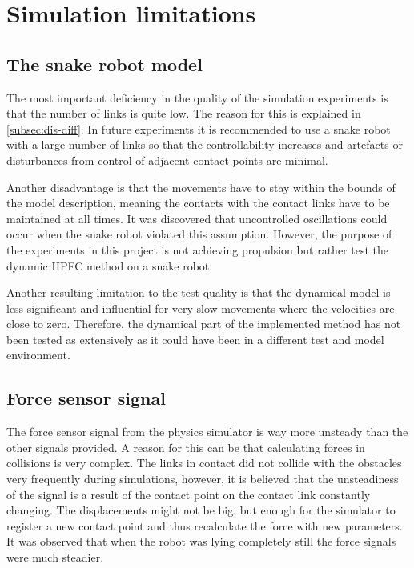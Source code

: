

\section{Simulation limitations}

\subsection{The snake robot model}

The most important deficiency in the quality of the simulation experiments is that the number of links is quite low. The reason for this is explained in \ref{subsec:dis-diff}. In future experiments it is recommended to use a snake robot with a large number of links so that the controllability increases and artefacts or disturbances from control of adjacent contact points are minimal.

Another disadvantage is that the movements have to stay within the bounds of the model description, meaning the contacts with the contact links have to be maintained at all times. It was discovered that uncontrolled oscillations could occur when the snake robot violated this assumption. However, the purpose of the experiments in this project is not achieving propulsion but rather test the dynamic HPFC method on a snake robot.

Another resulting limitation to the test quality is that the dynamical model is less significant and influential for very slow movements where the velocities are close to zero. Therefore, the dynamical part of the implemented method has not been tested as extensively as it could have been in a different test and model environment.

\subsection{Force sensor signal}

The force sensor signal from the physics simulator is way more unsteady than the other signals provided. A reason for this can be that calculating forces in collisions is very complex. The links in contact did not collide with the obstacles very frequently during simulations, however, it is believed that the unsteadiness of the signal is a result of the contact point on the contact link constantly changing. The displacements might not be big, but enough for the simulator to register a new contact point and thus recalculate the force with new parameters. It was observed that when the robot was lying completely still the force signals were much steadier.

